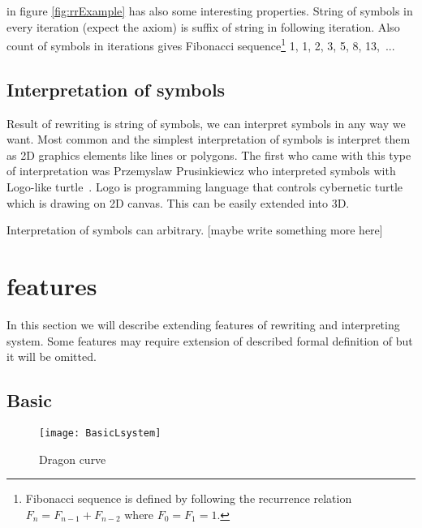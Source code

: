 \lsystem in figure \ref{fig:rrExample} has also some interesting properties.
String of symbols in every iteration (expect the axiom) is suffix of string in following iteration.
Also count of symbols in iterations gives Fibonacci sequence\footnote{Fibonacci sequence is defined by following the recurrence relation $F_n = F_{n-1} + F_{n-2}$ where $F_0 = F_1 = 1$.} 1, 1, 2, 3, 5, 8, 13,~...

\subsection{Interpretation of \lsystem symbols}

Result of \lsystem rewriting is string of symbols, we can interpret symbols in any way we want.
Most common and the simplest interpretation of \lsystem symbols is interpret them as 2D graphics elements like lines or polygons.
The first who came with this type of interpretation was Przemyslaw Prusinkiewicz who interpreted \lsystem symbols with Logo-like turtle~\cite{Pru85}.
Logo is programming language that controls cybernetic turtle which is drawing on 2D canvas.
This can be easily extended into 3D.

Interpretation of symbols can arbitrary. [maybe write something more here]


\section{\lsystem features}

In this section we will describe extending features of \lsystem rewriting and interpreting system.
Some features may require extension of described formal definition of \lsystem but it will be omitted.


\subsection{Basic \lsystem}

\begin{wrapfigure}{r}{0.5\textwidth}
	\vspace{-40pt}
	\begin{center}
	\texttt{[image: BasicLsystem]}
	\end{center}
	\caption{Dragon curve}
	\label{fig:basicLsystem}
\end{wrapfigure}


\newcommand{\dzerolsystem}{\mbox{D0L-system}\xspace}
\newcommand{\dlsystem}{\mbox{dL-system}\xspace}

